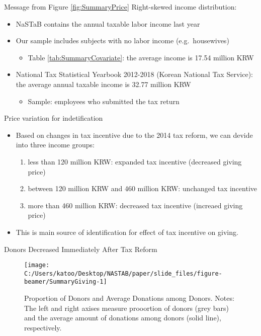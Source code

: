 \documentclass[
  ignorenonframetext,
  aspectratio=169,
]{beamer}
\providecommand{\tightlist}{%
  \setlength{\itemsep}{0pt}\setlength{\parskip}{0pt}}
\begin{document}
\begin{frame}{Message from Figure \ref{fig:SummaryPrice}}
\protect\hypertarget{message-from-figure-reffigsummaryprice}{}
Right-skewed income distribution:

\begin{itemize}
\tightlist
\item
  NaSTaB contains the annual taxable labor income last year
\item
  Our sample includes subjects with no labor income (e.g.~housewives)

  \begin{itemize}
  \tightlist
  \item
    Table \ref{tab:SummaryCovariate}: the average income is 17.54 million KRW
  \end{itemize}
\item
  National Tax Statistical Yearbook 2012-2018 (Korean National Tax Service): the average annual taxable income is 32.77 million KRW

  \begin{itemize}
  \tightlist
  \item
    Sample: employees who submitted the tax return
  \end{itemize}
\end{itemize}

Price variation for indetification

\begin{itemize}
\tightlist
\item
  Based on changes in tax incentive due to the 2014 tax reform, we can devide into three income groups:

  \begin{enumerate}
  \tightlist
  \item
    less than 120 million KRW: expanded tax incentive (decreased giving price)
  \item
    between 120 million KRW and 460 million KRW: unchanged tax incentive
  \item
    more than 460 million KRW: decreased tax incentive (increaed giving price)
  \end{enumerate}
\item
  This is main source of identification for effect of tax incentive on giving.
\end{itemize}
\end{frame}

\begin{frame}{Donors Decreased Immediately After Tax Reform}
\protect\hypertarget{donors-decreased-immediately-after-tax-reform}{}
\begin{figure}[t]

{\centering \texttt{[image: C:/Users/katoo/Desktop/NASTAB/paper/slide\_files/figure-beamer/SummaryGiving-1]} 

}

\caption{Proportion of Donors and Average Donations among Donors. Notes: The left and right axises measure prooortion of donors (grey bars) and the average amount of donations among donors (solid line), respectively.}\label{fig:SummaryGiving}
\end{figure}
\end{frame}
\end{document}
